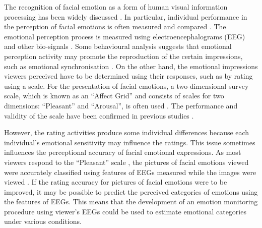 \documentclass[fonts]{icst}
\begin{document}
The recognition of facial emotion as a form of human visual information
processing has been widely discussed \cite{bruce88}.
In particular, individual performance in the perception of facial
emotions is often measured and compared \cite{kirouac84,biehl97,sherer11}. 
The emotional perception process is measured using electroencephalograms
(EEG) and other bio-signals \cite{batty:2003:EPS,lin10,petra10}. 
Some behavioural analysis suggests that emotional perception activity
may promote the reproduction of the certain impressions, such as emotional
synchronisation \cite{suzuki14}.
On the other hand, the emotional impressions viewers perceived have to
be determined using their responses, such as by rating using a scale. 
For the presentation of facial emotions, a two-dimensional survey scale,
which is known as an ``Affect Grid'' and consists of scales for two
dimensions: ``Pleasant'' and ``Arousal'',  is often used
\cite{russel:1989:AG}.   
The performance and validity of the scale have been confirmed in
previous studies \cite{takehara:2001:rtd,shibui:2005:amt}.  

However, the rating activities produce some individual differences
because each individual's emotional sensitivity may influence the
ratings.  
This issue sometimes influences the perceptional accuracy of
facial emotional expressions. 
As most viewers respond to the ``Pleasant'' scale \cite{barrett06}, 
the pictures of facial emotions viewed were accurately classified using
features of EEGs measured while the images were viewed \cite{minoru19}.
If the rating accuracy for pictures of facial emotions were to be
improved, it may be possible to predict the perceived categories of
emotions using the features of EEGs. 
This means that the development of an emotion monitoring procedure using
viewer's EEGs could be used to estimate emotional categories under
various conditions.  
\end{document}
